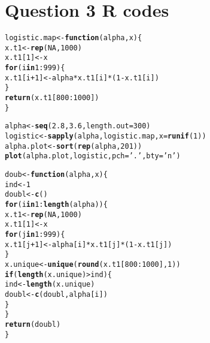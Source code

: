 \documentclass[12pt]{article}\usepackage[]{graphicx}\usepackage[]{color}
\makeatletter
\newcommand{\hlnum}[1]{\textcolor[rgb]{0.686,0.059,0.569}{#1}}%
\newcommand{\hlstr}[1]{\textcolor[rgb]{0.192,0.494,0.8}{#1}}%
\newcommand{\hlopt}[1]{\textcolor[rgb]{0,0,0}{#1}}%
\newcommand{\hlstd}[1]{\textcolor[rgb]{0.345,0.345,0.345}{#1}}%
\newcommand{\hlkwa}[1]{\textcolor[rgb]{0.161,0.373,0.58}{\textbf{#1}}}%
\newcommand{\hlkwb}[1]{\textcolor[rgb]{0.69,0.353,0.396}{#1}}%
\newcommand{\hlkwc}[1]{\textcolor[rgb]{0.333,0.667,0.333}{#1}}%
\newcommand{\hlkwd}[1]{\textcolor[rgb]{0.737,0.353,0.396}{\textbf{#1}}}%
\newenvironment{kframe}{%
 \def\at@end@of@kframe{}%
 \ifinner\ifhmode%
  \def\at@end@of@kframe{\end{minipage}}%
  \begin{minipage}{\columnwidth}%
 \fi\fi%
 \def\FrameCommand##1{\hskip\@totalleftmargin \hskip-\fboxsep
 \colorbox{shadecolor}{##1}\hskip-\fboxsep
     \hskip-\linewidth \hskip-\@totalleftmargin \hskip\columnwidth}%
 \MakeFramed {\advance\hsize-\width
   \@totalleftmargin\z@ \linewidth\hsize
   \@setminipage}}%
 {\par\unskip\endMakeFramed%
 \at@end@of@kframe}
\newenvironment{knitrout}{}{} %
\makeatother
\begin{document}
\section{Question 3 R codes}
\begin{knitrout}
\color{fgcolor}\begin{kframe}
\begin{alltt}
\hlstd{logistic.map} \hlkwb{<-} \hlkwa{function}\hlstd{(}\hlkwc{alpha}\hlstd{,} \hlkwc{x}\hlstd{)\{}
  \hlstd{x.t1} \hlkwb{<-} \hlkwd{rep}\hlstd{(}\hlnum{NA}\hlstd{,} \hlnum{1000}\hlstd{)}
  \hlstd{x.t1[}\hlnum{1}\hlstd{]} \hlkwb{<-} \hlstd{x}
  \hlkwa{for} \hlstd{(i} \hlkwa{in} \hlnum{1}\hlopt{:}\hlnum{999}\hlstd{)\{}
    \hlstd{x.t1[i}\hlopt{+}\hlnum{1}\hlstd{]} \hlkwb{<-} \hlstd{alpha} \hlopt{*} \hlstd{x.t1[i]} \hlopt{*} \hlstd{(}\hlnum{1}\hlopt{-}\hlstd{x.t1[i])}
  \hlstd{\}}
  \hlkwd{return}\hlstd{(x.t1[}\hlnum{800}\hlopt{:}\hlnum{1000}\hlstd{])}
\hlstd{\}}

\hlstd{alpha} \hlkwb{<-} \hlkwd{seq}\hlstd{(}\hlnum{2.8}\hlstd{,} \hlnum{3.6}\hlstd{,} \hlkwc{length.out} \hlstd{=} \hlnum{300}\hlstd{)}
\hlstd{logistic} \hlkwb{<-} \hlkwd{sapply}\hlstd{(alpha, logistic.map,} \hlkwc{x} \hlstd{=} \hlkwd{runif}\hlstd{(}\hlnum{1}\hlstd{))}
\hlstd{alpha.plot} \hlkwb{<-} \hlkwd{sort}\hlstd{(}\hlkwd{rep}\hlstd{(alpha,} \hlnum{201}\hlstd{))}
\hlkwd{plot}\hlstd{(alpha.plot, logistic,} \hlkwc{pch} \hlstd{=} \hlstr{'.'}\hlstd{,} \hlkwc{bty} \hlstd{=} \hlstr{'n'}\hlstd{)}


\hlstd{doub} \hlkwb{<-} \hlkwa{function}\hlstd{(}\hlkwc{alpha}\hlstd{,} \hlkwc{x}\hlstd{)\{}
  \hlstd{ind} \hlkwb{<-} \hlnum{1}
  \hlstd{doubl} \hlkwb{<-} \hlkwd{c}\hlstd{()}
  \hlkwa{for} \hlstd{(i} \hlkwa{in} \hlnum{1}\hlopt{:}\hlkwd{length}\hlstd{(alpha))\{}
    \hlstd{x.t1} \hlkwb{<-} \hlkwd{rep}\hlstd{(}\hlnum{NA}\hlstd{,} \hlnum{1000}\hlstd{)}
    \hlstd{x.t1[}\hlnum{1}\hlstd{]} \hlkwb{<-} \hlstd{x}
    \hlkwa{for} \hlstd{(j} \hlkwa{in} \hlnum{1}\hlopt{:}\hlnum{999}\hlstd{)\{}
      \hlstd{x.t1[j}\hlopt{+}\hlnum{1}\hlstd{]} \hlkwb{<-} \hlstd{alpha[i]} \hlopt{*} \hlstd{x.t1[j]} \hlopt{*} \hlstd{(}\hlnum{1}\hlopt{-}\hlstd{x.t1[j])}
    \hlstd{\}}
    \hlstd{x.unique} \hlkwb{<-} \hlkwd{unique}\hlstd{(}\hlkwd{round}\hlstd{(x.t1[}\hlnum{800}\hlopt{:}\hlnum{1000}\hlstd{],} \hlnum{1}\hlstd{))}
    \hlkwa{if} \hlstd{(}\hlkwd{length}\hlstd{(x.unique)} \hlopt{>} \hlstd{ind)\{}
      \hlstd{ind} \hlkwb{<-} \hlkwd{length}\hlstd{(x.unique)}
      \hlstd{doubl} \hlkwb{<-} \hlkwd{c}\hlstd{(doubl, alpha[i])}
    \hlstd{\}}
  \hlstd{\}}
  \hlkwd{return}\hlstd{(doubl)}
\hlstd{\}}


\end{alltt}
\end{kframe}
\end{knitrout}
\end{document}
